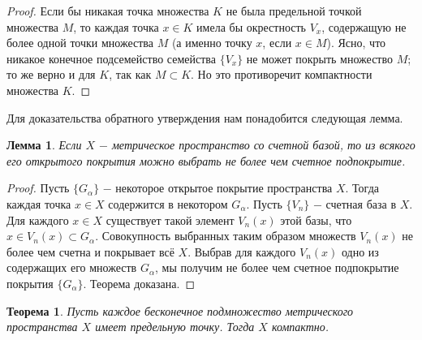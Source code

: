 \documentclass{article}
\newtheorem{theorem}{Теорема}[section]
\newtheorem*{lemma}{Лемма}
\begin{document}
\begin{proof}
Если бы никакая точка множества \(K\) не была предельной точкой множества \(M\), то каждая точка \(x \in K\) имела бы окрестность \(V_x\), содержащую не более одной точки множества \(M\) (а именно точку \(x\), если \(x \in M\)). Ясно, что никакое конечное подсемейство семейства \(\{V_x\}\) не может покрыть множество \(M\); то же верно и для \(K\), так как \(M \subset K\). Но это противоречит компактности множества \(K\).
\end{proof}

Для доказательства обратного утверждения нам понадобится следующая лемма.

\begin{lemma}
Если \(X\) \(-\) метрическое пространство со счетной базой, то из всякого его открытого покрытия можно выбрать не более чем счетное подпокрытие.
\end{lemma}

\begin{proof}
Пусть \(\{G_\alpha\}\) \(-\) некоторое открытое покрытие пространства \(X\). Тогда каждая точка \(x \in X\) содержится в некотором \(G_\alpha\). Пусть \(\{V_n\}\) \(-\) счетная база в \(X\). Для каждого \(x \in X\) существует такой элемент \(V_n(x)\) этой базы, что \(x \in V_n(x) \subset G_\alpha\). Совокупность выбранных таким образом множеств \(V_n(x)\) не более чем счетна и покрывает всё \(X\). Выбрав для каждого \(V_n(x)\) одно из содержащих его множеств \(G_\alpha\), мы получим не более чем счетное подпокрытие покрытия \(\{G_\alpha\}\). Теорема доказана.
\end{proof}

\begin{theorem}
Пусть каждое бесконечное подмножество метрического пространства \(X\) имеет предельную точку. Тогда \(X\) компактно.
\end{theorem}
\end{document}
